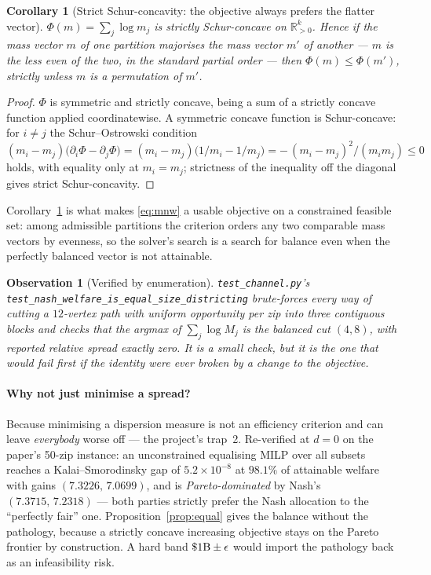 \documentclass[11pt]{article}
\newtheorem{cor}[prop]{Corollary}
\newtheorem{obs}{Observation}
\theoremstyle{definition}
\begin{document}
\begin{cor}[Strict Schur-concavity: the objective always prefers the flatter vector]
\label{cor:schur}
$\Phi(m)=\sum_j\log m_j$ is strictly Schur-concave on $\mathbb R^k_{>0}$. Hence if the
mass vector $m$ of one partition \emph{majorises} the mass vector $m'$ of another --- $m$
is the less even of the two, in the standard partial order --- then $\Phi(m)\le\Phi(m')$,
strictly unless $m$ is a permutation of $m'$.
\end{cor}

\begin{proof}
$\Phi$ is symmetric and strictly concave, being a sum of a strictly concave function
applied coordinatewise. A symmetric concave function is Schur-concave: for $i\ne j$ the
Schur--Ostrowski condition $(m_i-m_j)\bigl(\partial_i\Phi-\partial_j\Phi\bigr)
=(m_i-m_j)\bigl(1/m_i-1/m_j\bigr)=-\,(m_i-m_j)^2/(m_im_j)\le 0$ holds, with equality only
at $m_i=m_j$; strictness of the inequality off the diagonal gives strict Schur-concavity.
\end{proof}

Corollary~\ref{cor:schur} is what makes \eqref{eq:mnw} a usable objective on a constrained
feasible set: among admissible partitions the criterion orders any two comparable mass
vectors by evenness, so the solver's search is a search for balance even when the perfectly
balanced vector is not attainable.

\begin{obs}[Verified by enumeration]
\texttt{test\_channel.py}'s \texttt{test\_nash\_welfare\_\allowbreak is\_equal\_\allowbreak size\_districting} brute-forces
every way of cutting a $12$-vertex path with uniform opportunity per zip into three
\emph{contiguous} blocks and checks that the argmax of $\sum_j\log M_j$ is the balanced cut
$(4,8)$, with reported relative spread exactly zero. It is a small check, but it is the
one that would fail first if the identity were ever broken by a change to the objective.
\end{obs}

\paragraph{Why not just minimise a spread?}
Because minimising a dispersion measure is not an efficiency criterion and can leave
\emph{everybody} worse off --- the project's trap~2. Re-verified at $d=0$ on the paper's
50-zip instance: an unconstrained equalising MILP over all subsets reaches a
Kalai--Smorodinsky gap of $5.2\times10^{-8}$ at $98.1\%$ of attainable welfare with gains
$(7.3226,\,7.0699)$, and is \emph{Pareto-dominated} by Nash's $(7.3715,\,7.2318)$ --- both
parties strictly prefer the Nash allocation to the ``perfectly fair'' one.
Proposition~\ref{prop:equal} gives the balance without the pathology, because a strictly
concave increasing objective stays on the Pareto frontier by construction. A hard band
$\$1\text{B}\pm\epsilon$ would import the pathology back as an infeasibility risk.
\end{document}
